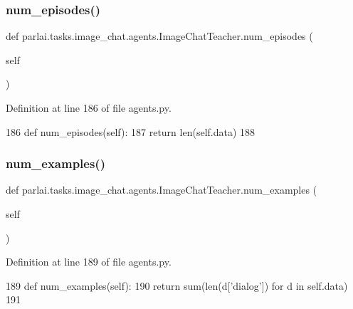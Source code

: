 \subsubsection{\texorpdfstring{num\+\_\+episodes()}{num\_episodes()}}
{\footnotesize\ttfamily def parlai.\+tasks.\+image\+\_\+chat.\+agents.\+Image\+Chat\+Teacher.\+num\+\_\+episodes (\begin{DoxyParamCaption}\item[{}]{self }\end{DoxyParamCaption})}



Definition at line 186 of file agents.\+py.


\begin{DoxyCode}
186     \textcolor{keyword}{def }num\_episodes(self):
187         \textcolor{keywordflow}{return} len(self.data)
188 
\end{DoxyCode}
\mbox{\label{classparlai_1_1tasks_1_1image__chat_1_1agents_1_1ImageChatTeacher_a79f6d03e7d21be3a61bad00252f8ea66}} 
\subsubsection{\texorpdfstring{num\+\_\+examples()}{num\_examples()}}
{\footnotesize\ttfamily def parlai.\+tasks.\+image\+\_\+chat.\+agents.\+Image\+Chat\+Teacher.\+num\+\_\+examples (\begin{DoxyParamCaption}\item[{}]{self }\end{DoxyParamCaption})}



Definition at line 189 of file agents.\+py.


\begin{DoxyCode}
189     \textcolor{keyword}{def }num\_examples(self):
190         \textcolor{keywordflow}{return} sum(len(d[\textcolor{stringliteral}{'dialog'}]) \textcolor{keywordflow}{for} d \textcolor{keywordflow}{in} self.data)
191 
\end{DoxyCode}
\mbox{\label{classparlai_1_1tasks_1_1image__chat_1_1agents_1_1ImageChatTeacher_aa91037220055d54a8d01877ae55a85f2}} 
